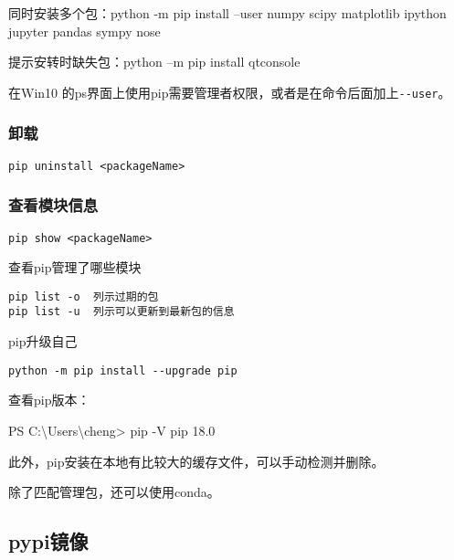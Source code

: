\documentclass[12pt]{ctexart}
\newenvironment{Shaded}{}{}
\newcommand{\FunctionTok}[1]{\textcolor[rgb]{0.02,0.16,0.49}{{#1}}}
\newcommand{\NormalTok}[1]{{#1}}
\begin{document}
同时安装多个包：python -m pip install --user numpy scipy matplotlib
ipython jupyter pandas sympy nose

提示安转时缺失包：python --m pip install qtconsole

在Win10
的ps界面上使用pip需要管理者权限，或者是在命令后面加上\texttt{-\/-user}。

\hypertarget{ux5378ux8f7d}{%
\subsubsection{卸载}\label{ux5378ux8f7d}}

\begin{verbatim}
pip uninstall <packageName>
\end{verbatim}

\hypertarget{ux67e5ux770bux6a21ux5757ux4fe1ux606f}{%
\subsubsection{查看模块信息}\label{ux67e5ux770bux6a21ux5757ux4fe1ux606f}}

\begin{verbatim}
pip show <packageName>
\end{verbatim}

查看pip管理了哪些模块

\begin{verbatim}
pip list -o  列示过期的包
pip list -u  列示可以更新到最新包的信息
\end{verbatim}

pip升级自己

\begin{verbatim}
python -m pip install --upgrade pip
\end{verbatim}

查看pip版本：

\begin{Shaded}
\begin{Highlighting}[]
\FunctionTok{PS}\NormalTok{ C:\textbackslash{}Users\textbackslash{}cheng> pip -V}
\NormalTok{pip 18.}\FunctionTok{0}
\end{Highlighting}
\end{Shaded}

此外，pip安装在本地有比较大的缓存文件，可以手动检测并删除。

除了匹配管理包，还可以使用conda。

\hypertarget{pypiux955cux50cf}{%
\subsection{pypi镜像}\label{pypiux955cux50cf}}
\end{document}
